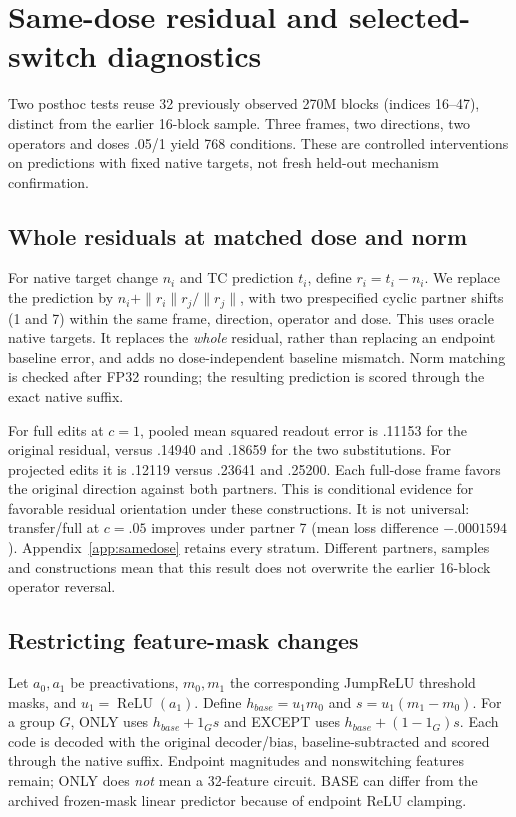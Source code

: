 \section{Same-dose residual and selected-switch diagnostics}\label{sec:samedose}
Two posthoc tests reuse 32 previously observed 270M blocks (indices 16--47), distinct from the earlier 16-block sample. Three frames, two directions, two operators and doses .05/1 yield 768 conditions. These are controlled interventions on predictions with fixed native targets, not fresh held-out mechanism confirmation.
\subsection{Whole residuals at matched dose and norm}
For native target change $n_i$ and TC prediction $t_i$, define $r_i=t_i-n_i$. We replace the prediction by $n_i+\|r_i\|r_j/\|r_j\|$, with two prespecified cyclic partner shifts (1 and 7) within the same frame, direction, operator and dose. This uses oracle native targets. It replaces the \emph{whole} residual, rather than replacing an endpoint baseline error, and adds no dose-independent baseline mismatch. Norm matching is checked after FP32 rounding; the resulting prediction is scored through the exact native suffix.

For full edits at $c=1$, pooled mean squared readout error is .11153 for the original residual, versus .14940 and .18659 for the two substitutions. For projected edits it is .12119 versus .23641 and .25200. Each full-dose frame favors the original direction against both partners. This is conditional evidence for favorable residual orientation under these constructions. It is not universal: transfer/full at $c=.05$ improves under partner 7 (mean loss difference $-.0001594$). Appendix~\ref{app:samedose} retains every stratum. Different partners, samples and constructions mean that this result does not overwrite the earlier 16-block operator reversal.
\subsection{Restricting feature-mask changes}
Let $a_0,a_1$ be preactivations, $m_0,m_1$ the corresponding JumpReLU threshold masks, and $u_1=\operatorname{ReLU}(a_1)$. Define $h_{base}=u_1m_0$ and $s=u_1(m_1-m_0)$. For a group $G$, ONLY uses $h_{base}+1_Gs$ and EXCEPT uses $h_{base}+(1-1_G)s$. Each code is decoded with the original decoder/bias, baseline-subtracted and scored through the native suffix. Endpoint magnitudes and nonswitching features remain; ONLY does \emph{not} mean a 32-feature circuit. BASE can differ from the archived frozen-mask linear predictor because of endpoint ReLU clamping.

